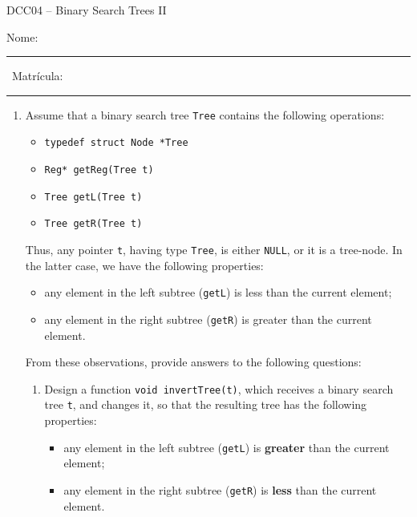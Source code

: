 \documentclass[12pt]{article}
\begin{document}
\begin{center}
\Large{DCC04 -- Binary Search Trees II}
\end{center}

\vspace{1cm}

\noindent
Nome: \rule{8cm}{0.01in} \ Matr\'{i}cula: \rule{3cm}{0.01in}

\vspace{1cm}


\begin{enumerate}

\item Assume that a binary search tree \texttt{Tree} contains the following
operations:

\begin{itemize}
\item \texttt{typedef struct Node *Tree}

\item \texttt{Reg* getReg(Tree t)}

\item \texttt{Tree getL(Tree t)}

\item \texttt{Tree getR(Tree t)}
\end{itemize}

Thus, any pointer \texttt{t}, having type \texttt{Tree}, is either \texttt{NULL},
or it is a tree-node.
In the latter case, we have the following properties:

\begin{itemize}
\item any element in the left subtree (\texttt{getL}) is less than the 
current element;
\item any element in the right subtree (\texttt{getR}) is greater than the 
current element.
\end{itemize}

From these observations, provide answers to the following questions:

\begin{enumerate}
\item Design a function \texttt{void invertTree(t)}, which receives a binary
search tree \texttt{t}, and changes it, so that the resulting tree has the
following properties:

\begin{itemize}
\item any element in the left subtree (\texttt{getL}) is \textbf{greater} than the 
current element;
\item any element in the right subtree (\texttt{getR}) is \textbf{less} than the 
current element.
\end{itemize}


\end{enumerate}
\end{enumerate}
\end{document}
